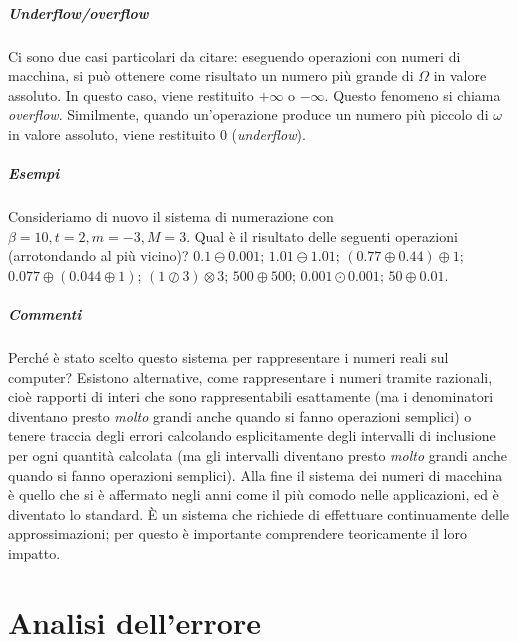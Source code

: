 \documentclass[a4paper]{report}
\theoremstyle{definiton}
\theoremstyle{remark}
\begin{document}
\paragraph{Underflow/overflow} Ci sono due casi particolari da citare: eseguendo operazioni con numeri di macchina, si può ottenere come risultato un numero più grande di $\Omega$ in valore assoluto. In questo caso, viene restituito $+\infty$ o $-\infty$. Questo fenomeno si chiama \emph{overflow}. Similmente, quando un'operazione produce un numero più piccolo di $\omega$ in valore assoluto, viene restituito $0$ (\emph{underflow}).

\paragraph{Esempi} Consideriamo di nuovo il sistema di numerazione con $\beta=10, t=2, m=-3, M=3$. Qual è il risultato delle seguenti operazioni (arrotondando al più vicino)? $0.1 \ominus 0.001$; $1.01 \ominus 1.01$; $(0.77 \oplus 0.44) \oplus 1$; $0.077 \oplus (0.044 \oplus 1)$; $(1 \oslash 3) \otimes 3$; $500 \oplus 500$; $0.001 \odot 0.001$; $50 \oplus 0.01$.


\paragraph{Commenti} Perché è stato scelto questo sistema per rappresentare i numeri reali sul computer? Esistono alternative, come rappresentare i numeri tramite razionali, cioè rapporti di interi che sono rappresentabili esattamente (ma i denominatori diventano presto \emph{molto} grandi anche quando si fanno operazioni semplici) o tenere traccia degli errori calcolando esplicitamente degli intervalli di inclusione per ogni quantità calcolata (ma gli intervalli diventano presto \emph{molto} grandi anche quando si fanno operazioni semplici). Alla fine il sistema dei numeri di macchina è quello che si è affermato negli anni come il più comodo nelle applicazioni, ed è diventato lo standard. È un sistema che richiede di effettuare continuamente delle approssimazioni; per questo è importante comprendere teoricamente il loro impatto.

\chapter{Analisi dell'errore}
\end{document}
